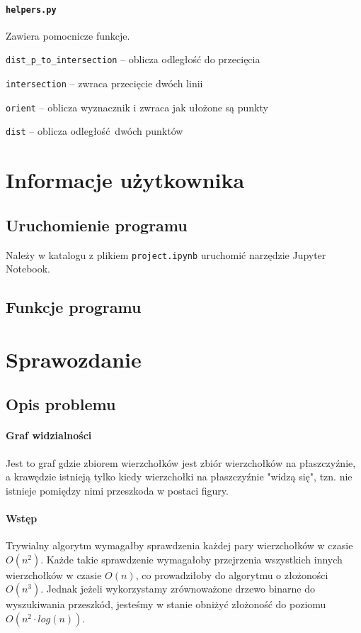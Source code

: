 \documentclass[12pt]{article}
\let\tempone\itemize
\let\temptwo\enditemize
\renewenvironment{itemize}{\tempone\setlength{\itemsep}{0cm}}{\temptwo}
\begin{document}
		\paragraph{\lstinline|helpers.py|}
			Zawiera pomocnicze funkcje.
			\begin{itemize}
				\item \lstinline|dist_p_to_intersection| -- oblicza odległość do przecięcia
				\item \lstinline|intersection| -- zwraca przecięcie dwóch linii
				\item \lstinline|orient| -- oblicza wyznacznik i zwraca jak ułożone są punkty 
				\item \lstinline|dist| -- oblicza odległość dwóch punktów
			\end{itemize}
	
	\section{Informacje użytkownika}
	
	\subsection{Uruchomienie programu}
		Należy w katalogu z plikiem \lstinline|project.ipynb| uruchomić narzędzie Jupyter Notebook.
	
	\subsection{Funkcje programu}
	
	\section{Sprawozdanie}
	
	\subsection{Opis problemu}
		\paragraph{Graf widzialności}
			Jest to graf gdzie zbiorem wierzchołków jest zbiór wierzchołków na płaszczyźnie, a krawędzie istnieją tylko kiedy wierzchołki na płaszczyźnie "widzą się", tzn. nie istnieje pomiędzy nimi przeszkoda w postaci figury.
		
		\paragraph{Wstęp}
			Trywialny algorytm wymagałby sprawdzenia każdej pary wierzchołków w czasie $ O(n^2) $. Każde takie sprawdzenie wymagałoby przejrzenia wszystkich innych wierzchołków w czasie $ O(n) $, co prowadziłoby do algorytmu o złożoności $ O(n^3) $. Jednak jeżeli wykorzystamy zrównoważone drzewo binarne do wyszukiwania przeszkód, jesteśmy w stanie obniżyć złożoność do poziomu $ O(n^2 \cdot log(n)) $.
		
\end{document}
